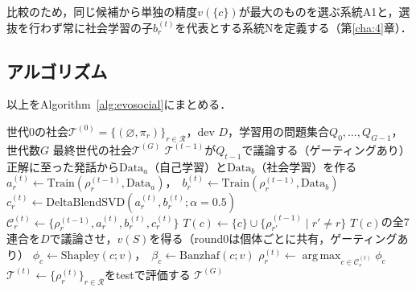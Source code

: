 比較のため，同じ候補から単独の精度$v(\{c\})$が最大のものを選ぶ系統A1と，選抜を行わず常に社会学習の子$b_r^{(t)}$を代表とする系統Nを定義する（第\ref{cha:4}章）．

\subsection{アルゴリズム}
\label{sec:3.5.6}

以上をAlgorithm~\ref{alg:evosocial}にまとめる．

\begin{algorithm}[htbp]
\caption{進化的社会学習（系統S）}
\label{alg:evosocial}
\renewcommand{\algorithmicrequire}{\textbf{入力:}}
\renewcommand{\algorithmicensure}{\textbf{出力:}}
\renewcommand{\algorithmiccomment}[1]{\hfill $\triangleright$ #1}
\small
\begin{algorithmic}[1]
\REQUIRE 世代0の社会$\mathcal{T}^{(0)} = \{(\varnothing, \pi_r)\}_{r \in \mathcal{R}}$，dev $D$，学習用の問題集合$Q_0, \dots, Q_{G-1}$，世代数$G$
\ENSURE 最終世代の社会$\mathcal{T}^{(G)}$
    \STATE $\mathcal{T}^{(t-1)}$が$Q_{t-1}$で議論する（ゲーティングあり） 
        \STATE 正解に至った発話から$\mathrm{Data}_a$（自己学習）と$\mathrm{Data}_b$（社会学習）を作る 
        \STATE $a_r^{(t)} \leftarrow \mathrm{Train}(\rho_r^{(t-1)}, \mathrm{Data}_a)$，\ $b_r^{(t)} \leftarrow \mathrm{Train}(\rho_r^{(t-1)}, \mathrm{Data}_b)$ 
        \STATE $c_r^{(t)} \leftarrow \mathrm{DeltaBlendSVD}(a_r^{(t)}, b_r^{(t)}; \alpha = 0.5)$ 
        \STATE $\mathcal{C}_r^{(t)} \leftarrow \{\rho_r^{(t-1)}, a_r^{(t)}, b_r^{(t)}, c_r^{(t)}\}$
    \ENDFOR
        \STATE $T(c) \leftarrow \{c\} \cup \{\rho_{r'}^{(t-1)} \mid r' \neq r\}$
        \STATE $T(c)$の全7連合を$D$で議論させ，$v(S)$を得る（round0は個体ごとに共有，ゲーティングあり）
        \STATE $\phi_c \leftarrow \mathrm{Shapley}(c; v)$，\ $\beta_c \leftarrow \mathrm{Banzhaf}(c; v)$ 
    \ENDFOR
        \STATE $\rho_r^{(t)} \leftarrow \mathop{\mathrm{arg\,max}}_{c \in \mathcal{C}_r^{(t)}} \phi_c$ 
    \ENDFOR
    \STATE $\mathcal{T}^{(t)} \leftarrow \{\rho_r^{(t)}\}_{r \in \mathcal{R}}$をtestで評価する 
\ENDFOR
\RETURN $\mathcal{T}^{(G)}$
\end{algorithmic}
\end{algorithm}

